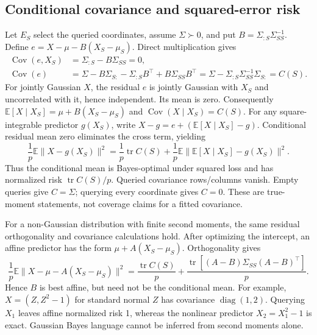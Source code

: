 \documentclass{article}
\newcommand{\tr}{\operatorname{tr}}
\newcommand{\E}{\mathbb{E}}
\newcommand{\Cov}{\operatorname{Cov}}
\begin{document}
\subsection{Conditional covariance and squared-error risk}
Let $E_S$ select the queried coordinates, assume $\Sigma\succ0$, and put $B=\Sigma_{:S}\Sigma_{SS}^{-1}$. Define $e=X-\mu-B(X_S-\mu_S)$. Direct multiplication gives
\begin{align}
 \Cov(e,X_S)&=\Sigma_{:S}-B\Sigma_{SS}=0,\\
 \Cov(e)&=\Sigma-B\Sigma_{S:}-\Sigma_{:S}B^\top+B\Sigma_{SS}B^\top
 =\Sigma-\Sigma_{:S}\Sigma_{SS}^{-1}\Sigma_{S:}=C(S).
\end{align}
For jointly Gaussian $X$, the residual $e$ is jointly Gaussian with $X_S$ and uncorrelated with it, hence independent. Its mean is zero. Consequently $\E[X\mid X_S]=\mu+B(X_S-\mu_S)$ and $\Cov(X\mid X_S)=C(S)$. For any square-integrable predictor $g(X_S)$, write $X-g=e+(\E[X\mid X_S]-g)$. Conditional residual mean zero eliminates the cross term, yielding
\begin{equation}
 \frac1p\E\|X-g(X_S)\|^2
 =\frac1p\tr C(S)+\frac1p\E\|\E[X\mid X_S]-g(X_S)\|^2.
\end{equation}
Thus the conditional mean is Bayes-optimal under squared loss and has normalized risk $\tr C(S)/p$. Queried covariance rows/columns vanish. Empty queries give $C=\Sigma$; querying every coordinate gives $C=0$. These are true-moment statements, not coverage claims for a fitted covariance.

For a non-Gaussian distribution with finite second moments, the same residual orthogonality and covariance calculations hold. After optimizing the intercept, an affine predictor has the form $\mu+A(X_S-\mu_S)$. Orthogonality gives
\begin{equation}
 \frac1p\E\|X-\mu-A(X_S-\mu_S)\|^2
 =\frac{\tr C(S)}p+\frac{\tr[(A-B)\Sigma_{SS}(A-B)^\top]}p.
\end{equation}
Hence $B$ is best affine, but need not be the conditional mean. For example, $X=(Z,Z^2-1)$ for standard normal $Z$ has covariance $\operatorname{diag}(1,2)$. Querying $X_1$ leaves affine normalized risk 1, whereas the nonlinear predictor $X_2=X_1^2-1$ is exact. Gaussian Bayes language cannot be inferred from second moments alone.
\end{document}
